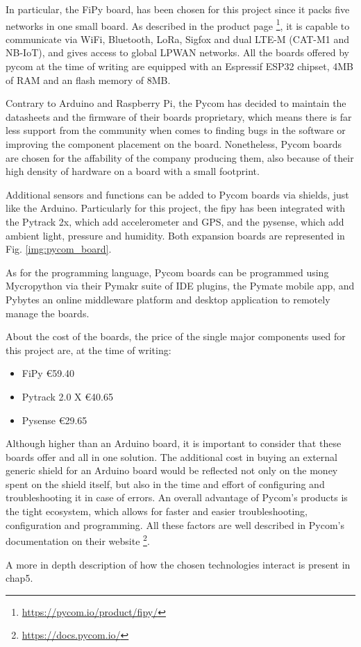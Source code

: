 		In particular, the FiPy board, has been chosen for this project since it packs five networks in one small board.
		As described in the product page \footnote{\url{https://pycom.io/product/fipy/}}, it is capable to communicate via WiFi, Bluetooth, LoRa, Sigfox and dual LTE-M (CAT-M1 and NB-IoT), and gives access to global LPWAN networks.
		All the boards offered by pycom at the time of writing are equipped with an Espressif ESP32 chipset, 4MB of RAM and an flash memory of 8MB.
		
		Contrary to Arduino and Raspberry Pi, the Pycom has decided to maintain the datasheets and the firmware of their boards proprietary, which means there is far less support from the community when comes to finding bugs in the software or improving the component placement on the board.
		Nonetheless, Pycom boards are chosen for the affability of the company producing them, also because of their high density of hardware on a board with a small footprint.
		
		Additional sensors and functions can be added to Pycom boards via shields, just like the Arduino.
		Particularly for this project, the fipy has been integrated with the Pytrack 2x, which add accelerometer and GPS, and the pysense, which add ambient light, pressure and humidity.
		Both expansion boards are represented in Fig. \ref{img:pycom_board}.
				
		As for the programming language, Pycom boards can be programmed using Mycropython via their Pymakr suite of IDE plugins, the Pymate mobile app, and Pybytes an online middleware platform and desktop application to remotely manage the boards.
		
		About the cost of the boards, the price of the single major components used for this project are, at the time of writing:
		\begin{itemize}[noitemsep]
			\item FiPy €59.40
			\item Pytrack 2.0 X €40.65
			\item Pysense €29.65
		\end{itemize}
		
		Although higher than an Arduino board, it is important to consider that these boards offer and all in one solution.
		The additional cost in buying an external generic shield for an Arduino board would be reflected not only on the money spent on the shield itself, but also in the time and effort of configuring and troubleshooting it in case of errors.
		An overall advantage of Pycom's products is the tight ecosystem, which allows for faster and easier troubleshooting, configuration and programming.
		All these factors are well described in Pycom's documentation on their website \footnote{\url{https://docs.pycom.io/}}.
		
		A more in depth description of how the chosen technologies interact is present in chap5.	